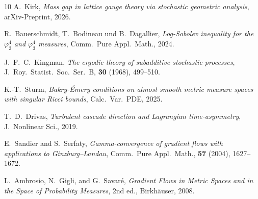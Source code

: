 \documentclass[12pt,a4paper]{article}
\theoremstyle{definition}
\theoremstyle{remark}
\begin{document}
\begin{thebibliography}{10}
A.~Kirk, \textit{Mass gap in lattice gauge theory via stochastic geometric analysis}, arXiv-Preprint, 2026.

R.~Bauerschmidt, T.~Bodineau und B.~Dagallier, \textit{Log-Sobolev inequality for the $\varphi^4_2$ and $\varphi^4_3$ measures}, Comm.~Pure Appl.~Math., 2024.

J.~F.~C.~Kingman, \textit{The ergodic theory of subadditive stochastic processes}, J.~Roy.\ Statist.\ Soc.\ Ser.~B, \textbf{30} (1968), 499--510.

K.-T.~Sturm, \textit{Bakry-\'Emery conditions on almost smooth metric measure spaces with singular Ricci bounds}, Calc.~Var.~PDE, 2025.

T.~D.~Drivas, \textit{Turbulent cascade direction and Lagrangian time-asymmetry}, J.~Nonlinear Sci., 2019.

E.~Sandier and S.~Serfaty, \textit{Gamma-convergence of gradient flows with applications to Ginzburg--Landau}, Comm.\ Pure Appl.\ Math., \textbf{57} (2004), 1627--1672.

L.~Ambrosio, N.~Gigli, and G.~Savar\'e, \textit{Gradient Flows in Metric Spaces and in the Space of Probability Measures}, 2nd ed., Birkh\"auser, 2008.

\end{thebibliography}
\end{document}
